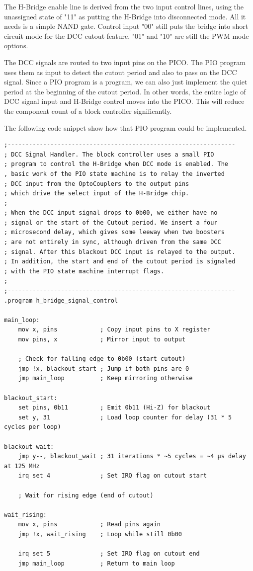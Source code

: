 The H-Bridge enable line is derived from the two  input control lines, using the unassigned state of "11" as putting the H-Bridge into disconnected mode. All it needs is a simple NAND gate. Control input "00" still puts the bridge into short circuit mode for the DCC cutout feature, "01" and "10" are still the PWM mode options. 

The DCC signals are routed to two input pins on the PICO. The PIO program uses them as input to detect the cutout period and also to pass on the DCC signal. Since a PIO program is a program, we can also just implement the quiet period at the beginning of the cutout period. In other words, the entire logic of DCC signal input and H-Bridge control moves into the PICO. This will reduce the component count of a block controller significantly.

The following code snippet show how that PIO program could be implemented.

\pagebreak[3] %
\lstset{style=codesnippetstyle}
\begin{lstlisting}
;----------------------------------------------------------------
; DCC Signal Handler. The block controller uses a small PIO 
; program to control the H-Bridge when DCC mode is enabled. The 
, basic work of the PIO state machine is to relay the inverted 
; DCC input from the OptoCouplers to the output pins
; which drive the select input of the H-Bridge chip. 
; 
; When the DCC input signal drops to 0b00, we either have no 
; signal or the start of the Cutout period. We insert a four 
; microsecond delay, which gives some leeway when two boosters
; are not entirely in sync, although driven from the same DCC 
; signal. After this blackout DCC input is relayed to the output.
; In addition, the start and end of the cutout period is signaled 
; with the PIO state machine interrupt flags.
;
;----------------------------------------------------------------
.program h_bridge_signal_control

main_loop:
    mov x, pins            ; Copy input pins to X register
    mov pins, x            ; Mirror input to output

    ; Check for falling edge to 0b00 (start cutout)
    jmp !x, blackout_start ; Jump if both pins are 0
    jmp main_loop          ; Keep mirroring otherwise

blackout_start:
    set pins, 0b11         ; Emit 0b11 (Hi-Z) for blackout
    set y, 31              ; Load loop counter for delay (31 * 5 cycles per loop)

blackout_wait:
    jmp y--, blackout_wait ; 31 iterations * ~5 cycles = ~4 µs delay at 125 MHz
    irq set 4              ; Set IRQ flag on cutout start

    ; Wait for rising edge (end of cutout)

wait_rising:
    mov x, pins            ; Read pins again
    jmp !x, wait_rising    ; Loop while still 0b00

    irq set 5              ; Set IRQ flag on cutout end
    jmp main_loop          ; Return to main loop
    
\end{lstlisting}

